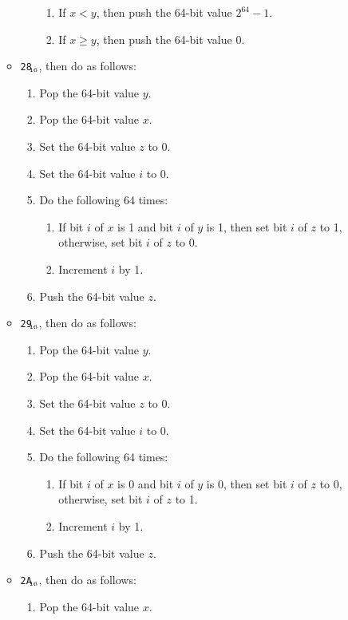 \documentclass[a4paper,12pt]{article}
\newcommand{\num}[1]{\texttt{#1}\xspace}
\newcommand{\hex}[1]{\num{#1}$_{\textup{\tiny\hskip-1ex 16}}$\xspace}
\newcommand{\op}[1]{#1}
\newcommand{\AND}       [1]{\op{\hex{28}}\xspace}
\newcommand{\OR}        [1]{\op{\hex{29}}\xspace}
\newcommand{\NOT}       [1]{\op{\hex{2A}}\xspace}
\begin{document}
\begin{enumerate}
\begin{itemize}
\begin{enumerate}
      \begin{enumerate}
      \item If $x < y$, then push the 64-bit value $2^{64} - 1$.
      \item If $x \ge y$, then push the 64-bit value 0.
      \end{enumerate}
    \end{enumerate}
  \item \AND{}, then do as follows:
    \begin{enumerate}
    \item Pop the 64-bit value $y$.
    \item Pop the 64-bit value $x$.
    \item Set the 64-bit value $z$ to 0.
    \item Set the 64-bit value $i$ to 0.
    \item Do the following 64 times:
      \begin{enumerate}
      \item If bit $i$ of $x$ is 1 and bit $i$ of $y$ is 1, then set bit $i$ of $z$ to 1, otherwise, set bit $i$ of $z$ to 0.
      \item Increment $i$ by 1.
      \end{enumerate}
    \item Push the 64-bit value $z$.
    \end{enumerate}
  \item \OR{}, then do as follows:
    \begin{enumerate}
    \item Pop the 64-bit value $y$.
    \item Pop the 64-bit value $x$.
    \item Set the 64-bit value $z$ to 0.
    \item Set the 64-bit value $i$ to 0.
    \item Do the following 64 times:
      \begin{enumerate}
      \item If bit $i$ of $x$ is 0 and bit $i$ of $y$ is 0, then set bit $i$ of $z$ to 0, otherwise, set bit $i$ of $z$ to 1.
      \item Increment $i$ by 1.
      \end{enumerate}
    \item Push the 64-bit value $z$.
    \end{enumerate}
  \item \NOT{}, then do as follows:
    \begin{enumerate}
    \item Pop the 64-bit value $x$.

\end{enumerate}
\end{itemize}
\end{enumerate}
\end{document}

